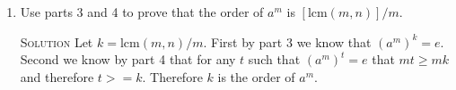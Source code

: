 \documentclass[twoside]{amsart}
\newcommand{\solution}{\textsc{Solution}\xspace}
\newcommand{\blank}{\vspace{5pt}}
\newcommand{\itm}{\blank\item}
\newcommand{\sol}{\blank\noindent\solution}
\begin{document}
\begin{enumerate}[A.]
\begin{enumerate}[1)]
      \sol If $(a^m)^t = e$ then $a^{mt} = e$ and by Theorem 5 $mt$ is a 
      multiple of $n$. So we know that for any value of $t$ for which
      $a^{mt} = e$, $n$ is a factor of $mt$. (this is all of the multiples that
      $m$ and $n$ have in common). Since $l$ is the least common multiple
      it must be less than or equal to $mt$.

      \itm Use parts 3 and 4 to prove that the order of $a^m$ is 
      $[\mathrm{lcm}(m,n)]/m$.

      \sol Let $k = \mathrm{lcm}(m,n)/m$. First by part 3 we know that
      $(a^m)^{k} = e$.  Second we know by part 4 that for any $t$ such that
      $(a^m)^t = e$ that $mt \ge mk$ and therefore $t >= k$. Therefore
      $k$ is the order of $a^m$.
   \end{enumerate}


\end{enumerate}
\end{document}
